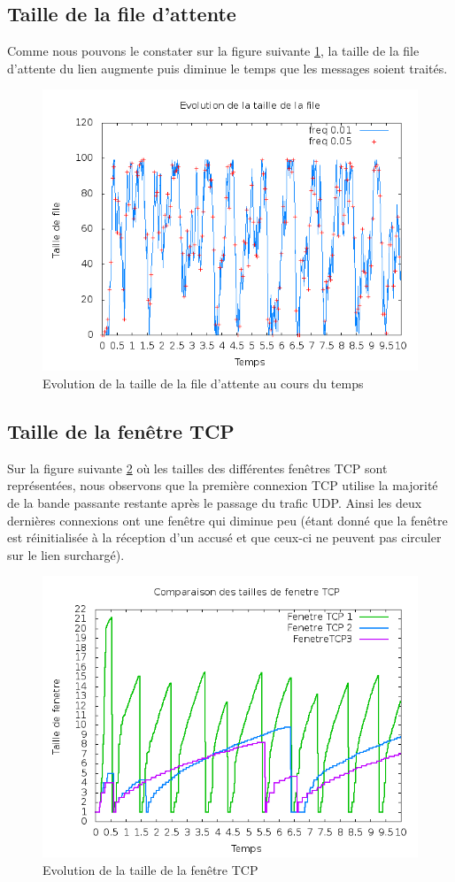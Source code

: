 \subsection{Taille de la file d'attente}

Comme nous pouvons le constater sur la figure suivante \ref{fa}, la taille de la file d'attente du lien augmente puis diminue
le temps que les messages soient traités.

\begin{figure}[!h]\label{fa}
\includegraphics[scale=0.7]{../res/queuesize.png}
\caption{Evolution de la taille de la file d'attente au cours du temps}
\end{figure}

\subsection{Taille de la fenêtre TCP}

Sur la figure suivante \ref{fe} où les tailles des différentes fenêtres TCP sont représentées, nous observons que la première
connexion TCP utilise la majorité de la bande passante restante après le passage du trafic UDP. Ainsi les deux dernières
connexions ont une fenêtre qui diminue peu (étant donné que la fenêtre est réinitialisée à la réception d'un accusé et que ceux-ci ne peuvent pas circuler sur le lien surchargé).

\begin{figure}[!h]\label{fe}
\includegraphics[scale=0.7]{../res/winsize.png}
\caption{Evolution de la taille de la fenêtre TCP}
\end{figure}

